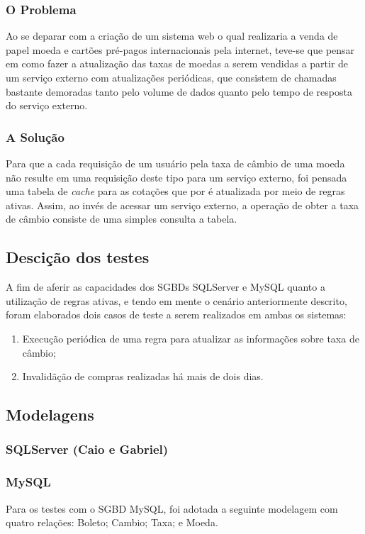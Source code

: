 \documentclass[conference]{IEEEtran}
\begin{document}
    \subsubsection{O Problema}
    Ao se deparar com a criação de um sistema web o qual realizaria a venda de papel moeda e cartões pré-pagos internacionais pela internet, teve-se que pensar em como fazer a atualização das taxas de moedas a serem vendidas a partir de um serviço externo com atualizações periódicas, que consistem de chamadas bastante demoradas tanto pelo volume de dados quanto pelo tempo de resposta do serviço externo.

    \subsubsection{A Solução}
    Para que a cada requisição de um usuário pela taxa de câmbio de uma moeda não resulte em uma requisição deste tipo para um serviço externo, foi pensada uma tabela de \textit{cache} para as cotações que por é atualizada por meio de regras ativas. Assim, ao invés de acessar um serviço externo, a operação de obter a taxa de câmbio consiste de uma simples consulta a tabela.

  \subsection{Descição dos testes}
  A fim de aferir as capacidades dos SGBDs SQLServer e MySQL quanto a utilização de regras ativas, e tendo em mente o cenário anteriormente descrito, foram elaborados dois casos de teste a serem realizados em ambas os sistemas:

  \begin{enumerate}
    \item Execução periódica de uma regra para atualizar as informações sobre taxa de câmbio;
    \item Invalidãção de compras realizadas há mais de dois dias.
  \end{enumerate}

  \subsection{Modelagens}
    \subsubsection{SQLServer (Caio e Gabriel)}
    \subsubsection{MySQL}
    Para os testes com o SGBD MySQL, foi adotada a seguinte modelagem com quatro relações: Boleto; Cambio; Taxa; e Moeda.
\end{document}
